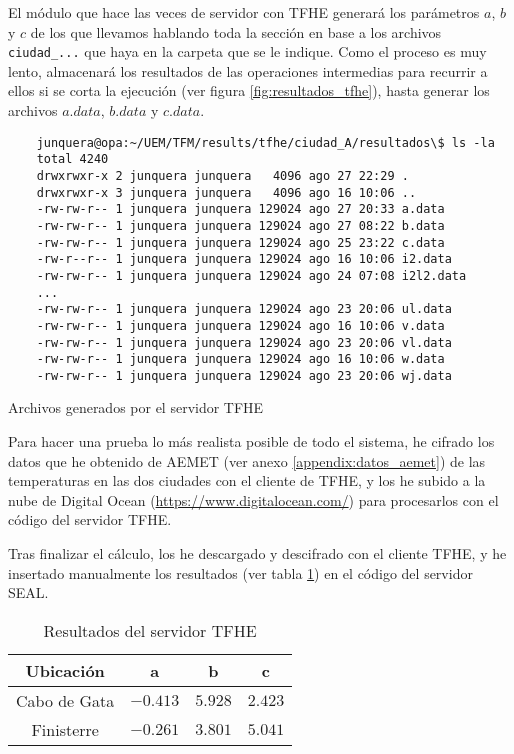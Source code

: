 El módulo que hace las veces de servidor con TFHE generará los parámetros $a$, $b$ y $c$ de los que llevamos hablando toda la sección en base a los archivos \verb|ciudad_...| que haya en la carpeta que se le indique. Como el proceso es muy lento, almacenará los resultados de las operaciones intermedias para recurrir a ellos si se corta la ejecución (ver figura \ref{fig:resultados_tfhe}), hasta generar los archivos $a.data$, $b.data$ y $c.data$.

\begin{listing}[ht]
    \begin{verbatim}
    junquera@opa:~/UEM/TFM/results/tfhe/ciudad_A/resultados\$ ls -la
    total 4240
    drwxrwxr-x 2 junquera junquera   4096 ago 27 22:29 .
    drwxrwxr-x 3 junquera junquera   4096 ago 16 10:06 ..
    -rw-rw-r-- 1 junquera junquera 129024 ago 27 20:33 a.data
    -rw-rw-r-- 1 junquera junquera 129024 ago 27 08:22 b.data
    -rw-rw-r-- 1 junquera junquera 129024 ago 25 23:22 c.data
    -rw-r--r-- 1 junquera junquera 129024 ago 16 10:06 i2.data
    -rw-rw-r-- 1 junquera junquera 129024 ago 24 07:08 i2l2.data
    ...
    -rw-rw-r-- 1 junquera junquera 129024 ago 23 20:06 ul.data
    -rw-rw-r-- 1 junquera junquera 129024 ago 16 10:06 v.data
    -rw-rw-r-- 1 junquera junquera 129024 ago 23 20:06 vl.data
    -rw-rw-r-- 1 junquera junquera 129024 ago 16 10:06 w.data
    -rw-rw-r-- 1 junquera junquera 129024 ago 23 20:06 wj.data
    \end{verbatim}
    \caption{Archivos generados por el servidor TFHE} \label{fig:resultados_tfhe}
\end{listing}

Para hacer una prueba lo más realista posible de todo el sistema, he cifrado los datos que he obtenido de AEMET (ver anexo \ref{appendix:datos_aemet}) de las temperaturas en las dos ciudades con el cliente de TFHE, y los he subido a la nube de Digital Ocean (\url{https://www.digitalocean.com/}) para procesarlos con el código del servidor TFHE.

Tras finalizar el cálculo, los he descargado y descifrado con el cliente TFHE, y he insertado manualmente los resultados (ver tabla \ref{table:r2_cg_ft}) en el código del servidor SEAL.

\begin{table}[]
    \centering
    \begin{tabular}{c c c c}
        Ubicación  & a & b & c \\
        \hline \hline
        Cabo de Gata    & $-0.413$ & $5.928$ & $2.423$ \\
        Finisterre    & $-0.261$ & $3.801$ & $5.041$
    \end{tabular}
    \caption{Resultados del servidor TFHE}
    \label{table:r2_cg_ft}
\end{table}

